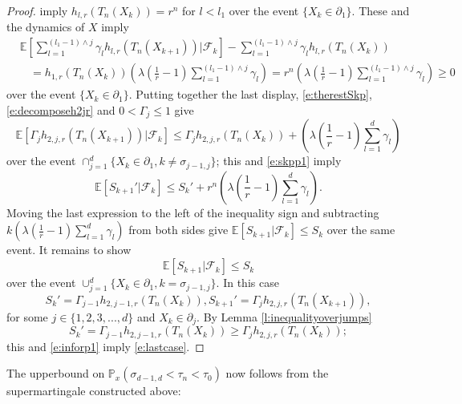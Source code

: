 \documentclass[11pt,a4paper]{article}
\begin{document}
\begin{proof}
imply $h_{l,r}(T_n(X_k)) = r^n$ for $l < l_1$
over the event $\{X_k \in \partial_1\}$.
These 
and the dynamics of $X$ imply
\begin{align*}
&{\mathbb E}
\left
[\sum_{l=1}^{(l_1 -1)\wedge j} \gamma_l h_{l,r}(T_n(X_{k+1}))
| {\mathscr F}_k \right] -
\sum_{l=1}^{(l_{1} -1)\wedge j} \gamma_l h_{l,r}(T_n(X_k))\\
&~~~~=
h_{1,r}(T_n(X_k))
\left(
\lambda \left( \frac{1}{r} - 1 \right)
\sum_{l=1}^{(l_{1} -1)\wedge j} \gamma_l 
\right) 
= 
r^n 
\left(
\lambda \left( \frac{1}{r} - 1 \right)
\sum_{l=1}^{(l_{1} -1)\wedge j} \gamma_l 
\right) 
\ge 0
\end{align*}
over the event $\{ X_k \in \partial_1\}.$ Putting together the last
display, \eqref{e:therestSkp}, \eqref{e:decomposeh2jr}
and $0 < \Gamma_j \le 1$
give
\begin{equation}\label{e:inforp1}
{\mathbb E}[ \Gamma_{j} h_{2,j,r}(T_n(X_{k+1}))| {\mathscr F}_k]
\le 
\Gamma_{j} h_{2,j,r}(T_n(X_{k})) + 
\left(
\lambda \left( \frac{1}{r} - 1 \right)
\sum_{l=1}^{d} \gamma_l 
\right)
\end{equation}
over the event 
$\cap_{j=1}^d \{X_k \in \partial_1, k \neq \sigma_{j-1,j}\}$;
this and \eqref{e:skpp1} imply
\[
{\mathbb E}[S_{k+1}' | {\mathscr F}_k] 
\le 
 S_{k}'  +
r^n
\left(
\lambda \left( \frac{1}{r} - 1 \right)
\sum_{l=1}^{d} \gamma_l 
\right).
\]
Moving the last expression to the left of the inequality sign
and
subtracting
$k 
\left(
\lambda \left( \frac{1}{r} - 1 \right)
\sum_{l=1}^{d} \gamma_l 
\right)
$ from both sides give
${\mathbb E}[S_{k+1} | {\mathscr F}_k] \le S_{k}$ over the same event.
It remains to show 
\begin{equation}\label{e:lastcase}
{\mathbb E}[S_{k+1} | {\mathscr F}_k] \le S_{k}
\end{equation}
over the event  
$\cup_{j=1}^d \{X_k \in \partial_1,  k = \sigma_{j-1,j} \}.$ 
In this case
\[
 S_{k}'=\Gamma_{j-1} h_{2,j-1,r}(T_n(X_{k})),
S_{k+1}' = \Gamma_j h_{2,j,r}(T_n(X_{k+1})),
\]
for some $j \in \{1,2,3,...,d\}$ and $X_k \in \partial_j.$
By Lemma \ref{l:inequalityoverjumps} 
\[
S_{k}'=\Gamma_{j-1} h_{2,j-1,r}(T_n(X_{k})) \ge
\Gamma_{j} h_{2,j,r}(T_n(X_{k}));
\]
this and \eqref{e:inforp1} imply \eqref{e:lastcase}.
\end{proof}
The upperbound
on
${\mathbb P}_{x}(\sigma_{d-1,d} < \tau_n < \tau_0)$
now follows from the supermartingale constructed above:
\end{document}
